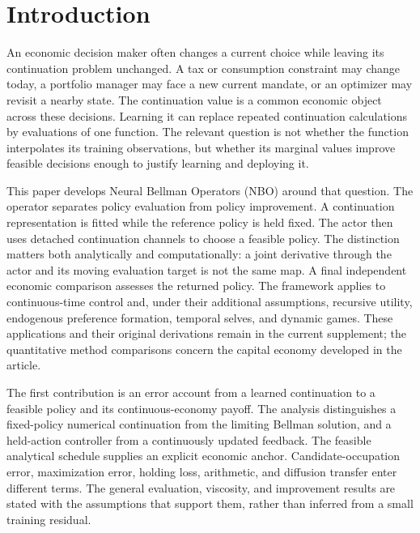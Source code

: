 \section{Introduction}\label{sec:introduction}
An economic decision maker often changes a current choice while leaving its continuation problem unchanged. A tax or consumption constraint may change today, a portfolio manager may face a new current mandate, or an optimizer may revisit a nearby state. The continuation value is a common economic object across these decisions. Learning it can replace repeated continuation calculations by evaluations of one function. The relevant question is not whether the function interpolates its training observations, but whether its marginal values improve feasible decisions enough to justify learning and deploying it.

This paper develops Neural Bellman Operators (NBO) around that question. The operator separates policy evaluation from policy improvement. A continuation representation is fitted while the reference policy is held fixed. The actor then uses detached continuation channels to choose a feasible policy. The distinction matters both analytically and computationally: a joint derivative through the actor and its moving evaluation target is not the same map. A final independent economic comparison assesses the returned policy. The framework applies to continuous-time control and, under their additional assumptions, recursive utility, endogenous preference formation, temporal selves, and dynamic games. These applications and their original derivations remain in the current supplement; the quantitative method comparisons concern the capital economy developed in the article.

The first contribution is an error account from a learned continuation to a feasible policy and its continuous-economy payoff. The analysis distinguishes a fixed-policy numerical continuation from the limiting Bellman solution, and a held-action controller from a continuously updated feedback. The feasible analytical schedule supplies an explicit economic anchor. Candidate-occupation error, maximization error, holding loss, arithmetic, and diffusion transfer enter different terms. The general evaluation, viscosity, and improvement results are stated with the assumptions that support them, rather than inferred from a small training residual.

